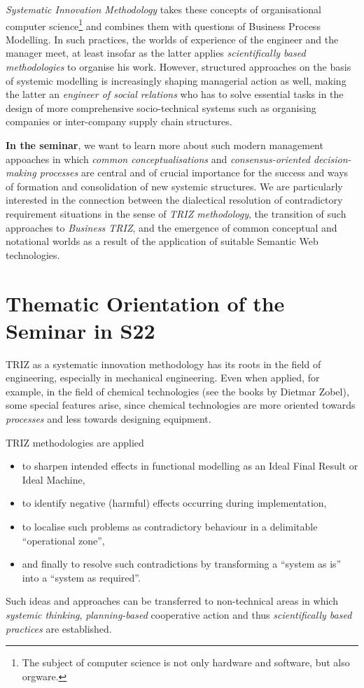 \documentclass[11pt,a4paper]{article}
\begin{document}
\emph{Systematic Innovation Methodology} takes these concepts of
organisational computer science\footnote{The subject of computer science is
  not only hardware and software, but also orgware.} and combines them with
questions of Business Process Modelling. In such practices, the worlds of
experience of the engineer and the manager meet, at least insofar as the
latter applies \emph{scientifically based methodologies} to organise his work.
However, structured approaches on the basis of systemic modelling is
increasingly shaping managerial action as well, making the latter an
\emph{engineer of social relations} who has to solve essential tasks in the
design of more comprehensive socio-technical systems such as organising
companies or inter-company supply chain structures.

\textbf{In the seminar}, we want to learn more about such modern management
appoaches in which \emph{common conceptualisations} and
\emph{consensus-oriented decision-making processes} are central and of crucial
importance for the success and ways of formation and consolidation of new
systemic structures.  We are particularly interested in the connection between
the dialectical resolution of contradictory requirement situations in the
sense of \emph{TRIZ methodology}, the transition of such approaches to
\emph{Business TRIZ}, and the emergence of common conceptual and notational
worlds as a result of the application of suitable Semantic Web technologies.

\section{Thematic Orientation of the Seminar in S22}

TRIZ as a systematic innovation methodology has its roots in the field of
engineering, especially in mechanical engineering. Even when applied, for
example, in the field of chemical technologies (see the books by Dietmar
Zobel), some special features arise, since chemical technologies are more
oriented towards \emph{processes} and less towards designing equipment.

TRIZ methodologies are applied 
\begin{itemize}
\item to sharpen intended effects in functional modelling as an Ideal Final
  Result or Ideal Machine,
\item to identify negative (harmful) effects occurring during implementation, 
\item to localise such problems as contradictory behaviour in a delimitable
  \enquote{operational zone}, 
\item and finally to resolve such contradictions by transforming a
  \enquote{system as is} into a \enquote{system as required}.
\end{itemize}
Such ideas and approaches can be transferred to non-technical areas in which
\emph{systemic thinking}, \emph{planning-based} cooperative action and thus
\emph{scientifically based practices} are established.
\end{document}

